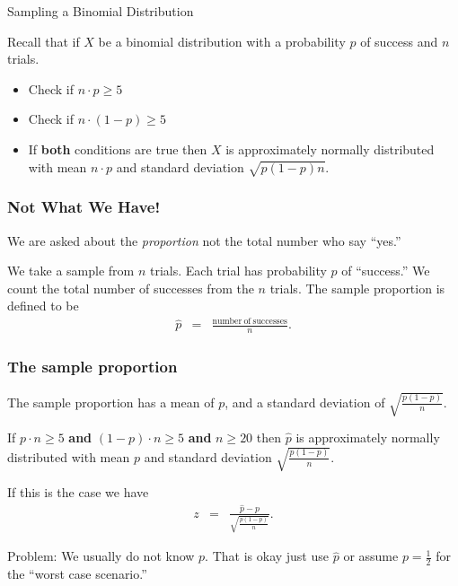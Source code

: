 \begin{frame}{Sampling a Binomial Distribution}

  Recall that if $X$ be a binomial distribution with a probability $p$
  of success and $n$ trials.
  \begin{itemize}
  \item Check if $n\cdot p \geq 5$ 
  \item Check if $n\cdot (1-p) \geq 5$ 
  \item If \textbf{both} conditions are true then $X$ is approximately
    normally distributed with mean $n\cdot p$ and standard deviation
    $\sqrt{p(1-p)n}$.
  \end{itemize}

  
\end{frame}


\begin{frame}
  \frametitle{Not What We Have!}

  We are asked about the \textit{proportion} not the total number who
  say ``yes.''

  \vfill

  \begin{definition}

    We take a sample from $n$ trials. Each trial has probability $p$
    of ``success.'' We count the total number of successes from the
    $n$ trials.  The sample proportion is defined to be
    \begin{eqnarray*}
      \hat{p} & = & \frac{\mathrm{number~of~successes}}{n}.
    \end{eqnarray*}
    
  \end{definition}



\end{frame}

\begin{frame}
  \frametitle{The sample proportion}

  The sample proportion has a mean of $p$, and a standard deviation of
  $\sqrt{\frac{p(1-p)}{n}}$.

  \vfill

  {

    If $p\cdot n \geq 5$ \textbf{and} $(1-p)\cdot n \geq 5$
    \textbf{and} $n\geq 20$ then $\hat{p}$ is approximately normally
    distributed with mean $p$ and standard deviation
    $\sqrt{\frac{p(1-p)}{n}}$.

  }

  \vfill

  {
    If this is the case we have
    \begin{eqnarray*}
      z & = & \frac{\hat{p}-p}{\sqrt{\frac{p(1-p)}{n}}}.
    \end{eqnarray*}
  }

  \vfill

  {

    Problem: We usually do not know $p$. That is okay just use
    $\hat{p}$ or assume $p=\frac{1}{2}$ for the ``worst case
    scenario.''

  }


\end{frame}


